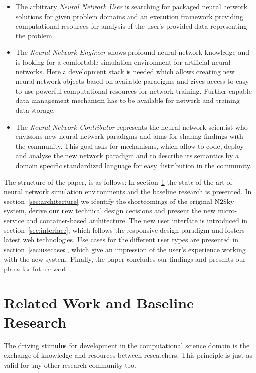 \documentclass[conference]{IEEEtran}
\begin{document}
\begin{itemize}
  \item The arbitrary \emph{Neural Network User} is searching for packaged neural network solutions for given problem domains and an execution framework providing computational resources for analysis of the user's provided data representing the problem.
  \item The \emph{Neural Network Engineer} shows profound neural network knowledge and is looking for a comfortable simulation environment for artificial neural networks. Here a development stack is needed which allows creating new neural network objects based on available paradigms and gives access to easy to use powerful computational resources for network training. Further capable data management mechanism has to be available for network and training data storage.
  \item The \emph{Neural Network Contributor} represents the neural network scientist who envisions new neural network paradigms and aims for sharing findings with the community. This goal asks for mechanisms, which allow to code, deploy and analyse the new network paradigm and to describe its semantics by a domain specific standardized language for easy distribution in the community.
\end{itemize}

The structure of the paper, is as follows: In section~\ref{sec:SOTA} the state of the art of neural
network simulation environments and the baseline research is presented. In section~\ref{sec:architecture} we identify the shortcomings of the original N2Sky system, derive our new technical design decisions and present the new micro-service and container-based architecture. The new user interface is introduced in section~\ref{sec:interface}, which follows the responsive design paradigm and fosters latest web technologies.
Use cases for the different user types are presented in section~\ref{sec:usecases}, which give an impression of the user's experience working with the new system.
Finally, the paper concludes our findings and presents our plans for future work.

\section{Related Work and Baseline Research}
\label{sec:SOTA}

The driving stimulus for development in the computational science domain is the exchange of knowledge
and resources between researchers. This principle is just as valid for any other research community too.
\end{document}
